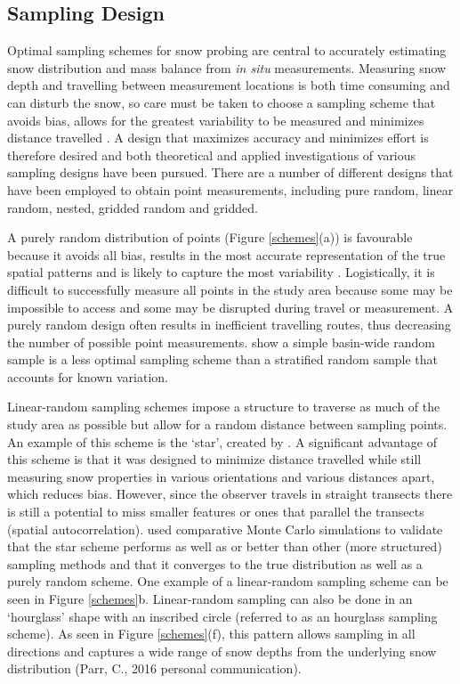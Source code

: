 \documentclass{sfuthesis}
\begin{document}
\subsection{Sampling Design}

Optimal sampling schemes for snow probing are central to accurately estimating snow distribution and mass balance from \textit{in situ} measurements. Measuring snow depth and travelling between measurement locations is both time consuming and can disturb the snow, so care must be taken to choose a sampling scheme that avoids bias, allows for the greatest variability to be measured and minimizes distance travelled \citep{Shea2010}. A design that maximizes accuracy and minimizes effort is therefore desired \citep{Elder1991} and both theoretical \citep{Trujillo2015} and applied \citep{Kronholm2004,Shea2010} investigations of various sampling designs have been pursued. There are a number of different designs that have been employed to obtain point measurements, including pure random, linear random, nested, gridded random and gridded. 

A purely random distribution of points (Figure \ref{schemes}(a)) is favourable because it avoids all bias, results in the most accurate representation of the true spatial patterns and is likely to capture the most variability \citep{Kronholm2007, Shea2010}. Logistically, it is difficult to successfully measure all points in the study area because some may be impossible to access and some may be disrupted during travel or measurement. A purely random design often results in inefficient travelling routes, thus decreasing the number of possible point measurements. \cite{Elder1991} show a simple basin-wide random sample is a less optimal sampling scheme than a stratified random sample that accounts for known variation. 

Linear-random sampling schemes impose a structure to traverse as much of the study area as possible but allow for a random distance between sampling points. An example of this scheme is the `star', created by \cite{Shea2010}. A significant advantage of this scheme is that it was designed to minimize distance travelled while still measuring snow properties in various orientations and various distances apart, which reduces bias. However, since the observer travels in straight transects there is still a potential to miss smaller features or ones that parallel the transects (spatial autocorrelation). \cite{Shea2010} used comparative Monte Carlo simulations to validate that the star scheme performs as well as or better than other (more structured) sampling methods and that it converges to the true distribution as well as a purely random scheme. One example of a linear-random sampling scheme can be seen in Figure \ref{schemes}b. Linear-random sampling can also be done in an `hourglass' shape with an inscribed circle (referred to as an hourglass sampling scheme). As seen in Figure \ref{schemes}(f), this pattern allows sampling in all directions and captures a wide range of snow depths from the underlying snow distribution (Parr, C., 2016 personal communication).
\end{document}
